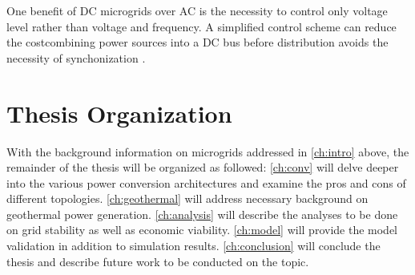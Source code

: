 One benefit of DC microgrids over AC is the necessity to control only voltage level rather than voltage and frequency. A simplified control scheme can reduce the costcombining power sources into a DC bus before distribution avoids the necessity of synchonization \cite{Lotfi2015}.

\section{Thesis Organization}
With the background information on microgrids addressed in \autoref{ch:intro} above, the remainder of the thesis will be organized as followed: \autoref{ch:conv} will delve deeper into the various power conversion architectures and examine the pros and cons of different topologies. \autoref{ch:geothermal} will address necessary background on geothermal power generation. \autoref{ch:analysis} will describe the analyses to be done on grid stability as well as economic viability. \autoref{ch:model} will provide the model validation in addition to simulation results. \autoref{ch:conclusion} will conclude the thesis and describe future work to be conducted on the topic.


